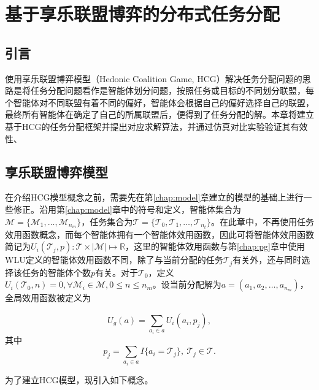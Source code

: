 
\chapter{基于享乐联盟博弈的分布式任务分配}
\label{chap:hedonic}

\section{引言}
\label{hg:sec:intro}

使用享乐联盟博弈模型（Hedonic Coalition Game, HCG）解决任务分配问题的思路是将任务分配问题看作是智能体划分问题，按照任务或目标的不同划分联盟，每个智能体对不同联盟有着不同的偏好，智能体会根据自己的偏好选择自己的联盟，最终所有智能体在确定了自己的所属联盟后，便得到了任务分配的解。本章将建立基于HCG的任务分配框架并提出对应求解算法，并通过仿真对比实验验证其有效性、


\section{享乐联盟博弈模型}
\label{hg:sec:hgmodel}

在介绍HCG模型概念之前，需要先在第\ref{chap:model}章建立的模型的基础上进行一些修正。沿用第\ref{chap:model}章中的符号和定义，智能体集合为$\mathcal{M}=\{\mathcal{M}_1,\dots,\mathcal{M}_{n_m}\}$，任务集合为$\mathcal{T} = \{\mathcal{T}_0,\mathcal{T}_1,\dots,\mathcal{T}_{n_t}\}$。在此章中，不再使用任务效用函数概念，而每个智能体拥有一个智能体效用函数，因此可将智能体效用函数简记为$U_i(\mathcal{T}_j,p):\mathcal{T} \times |\mathcal{M}| \mapsto \mathbb{R}$，这里的智能体效用函数与第\ref{chap:pg}章中使用WLU定义的智能体效用函数不同，除了与当前分配的任务$\mathcal{T}_j$有关外，还与同时选择该任务的智能体个数$p$有关。对于$\mathcal{T}_0$，定义$U_i(\mathcal{T}_0,n)=0,\forall \mathcal{M}_i \in \mathcal{M}, 0 \leq n \leq n_m$。设当前分配解为$a=(a_1,a_2,\dots,a_{n_m})$，全局效用函数被定义为

\begin{equation}
\label{hcg:eq:gloablU}
	U_g(a) = \sum_{a_i \in a} U_i(a_i,p_j),
\end{equation}
其中
\begin{equation}
\label{hcg:eq:parcitipants}
	p_j = \sum_{a_i \in a} I\{a_i = \mathcal{T}_j\},\ \mathcal{T}_j \in \mathcal{T}.
\end{equation}

为了建立HCG模型，现引入如下概念。

